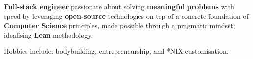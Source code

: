 

\begin{cvparagraph}
  \textbf{Full-stack engineer} passionate about solving \textbf{meaningful problems} with speed by leveraging \textbf{open-source} technologies on top of a concrete foundation of \textbf{Computer Science} principles, made possible through a pragmatic mindset; idealising \textbf{Lean} methodology.
  
  {\footnotesize Hobbies include: bodybuilding, entrepreneurship, and *NIX customisation.}
\end{cvparagraph}
